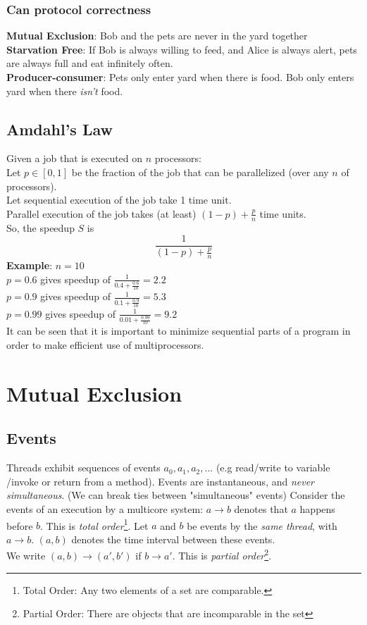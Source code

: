 \documentclass{article}
\begin{document}
\subsubsection{Can protocol correctness}
\textbf{Mutual Exclusion}: Bob and the pets are never in the yard together
\\\textbf{Starvation Free}: If Bob is always willing to feed, and Alice is always alert, pets are always full and eat infinitely often.
\\\textbf{Producer-consumer}: Pets only enter yard when there is food. Bob only enters yard when there \textit{isn't} food.

\subsection{Amdahl's Law}
Given a job that is executed on $n$ processors:
\\Let $p \in [0,1]$ be the fraction of the job that can be parallelized (over any $n$ of processors).
\\Let sequential execution of the job take 1 time unit.
\\Parallel execution of the job takes (at least) $(1-p)+\frac{p}{n}$ time units.
\\So, the speedup $S$ is 
$$\frac{1}{(1-p)+\frac{p}{n}}$$
\textbf{Example}:
$n=10$
\\$p=0.6$ gives speedup of $\frac{1}{0.4 + \frac{0.6}{10}}=2.2$
\\$p=0.9$ gives speedup of $\frac{1}{0.1 + \frac{0.9}{10}}=5.3$
\\$p=0.99$ gives speedup of $\frac{1}{0.01 + \frac{0.99}{10}}=9.2$
\\It can be seen that it is important to minimize sequential parts of a program in order to make efficient use of multiprocessors.






%
%
\section{Mutual Exclusion}
\subsection{Events}
Threads exhibit sequences of events $a_0, a_1, a_2,...$ (e.g read/write to variable /invoke or return from a method).
\bigbreak Events are instantaneous, and \textit{never simultaneous}. (We can break ties between "simultaneous" events)
\bigbreak Consider the events of an execution by a multicore system:
$a\rightarrow b$ denotes that $a$ happens before $b$. This is \textit{total order}\footnote{Total Order: Any two elements of a set are comparable.}.
\bigbreak Let $a$ and $b$ be events by the \textit{same thread}, with $a \rightarrow b$.
\bigbreak$(a,b)$ denotes the time interval between these events.
\\We write $(a,b) \rightarrow (a',b')$ if $b \rightarrow a'$. This is \textit{partial order}\footnote{Partial Order: There are objects that are incomparable in the set}.
\end{document}

